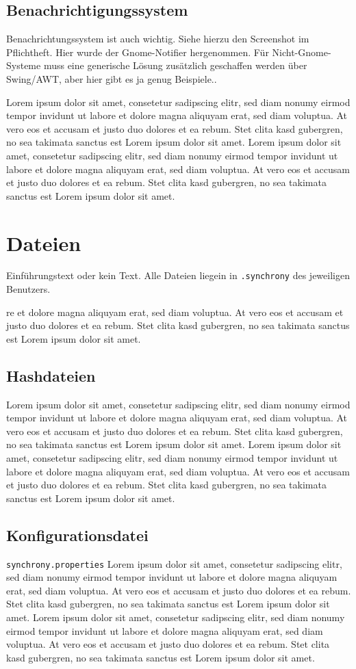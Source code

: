 \documentclass[12pt,oneside,a4paper,bibtotoc,liststotoc,pointlessnumbers]{scrartcl}
\begin{document}
\subsection{Benachrichtigungssystem}
Benachrichtungssystem ist auch wichtig. Siehe hierzu den Screenshot im Pflichtheft. Hier wurde der Gnome-Notifier hergenommen. Für Nicht-Gnome-Systeme muss eine generische Lösung zusätzlich geschaffen werden über Swing/AWT, aber hier gibt es ja genug Beispiele..

\vspace{12px}
Lorem ipsum dolor sit amet, consetetur sadipscing elitr, sed diam nonumy eirmod tempor invidunt ut labore et dolore magna aliquyam erat, sed diam voluptua. At vero eos et accusam et justo duo dolores et ea rebum. Stet clita kasd gubergren, no sea takimata sanctus est Lorem ipsum dolor sit amet. Lorem ipsum dolor sit amet, consetetur sadipscing elitr, sed diam nonumy eirmod tempor invidunt ut labore et dolore magna aliquyam erat, sed diam voluptua. At vero eos et accusam et justo duo dolores et ea rebum. Stet clita kasd gubergren, no sea takimata sanctus est Lorem ipsum dolor sit amet.

\newpage
\section{Dateien}
Einführungstext oder kein Text. Alle Dateien liegein in \texttt{.synchrony} des jeweiligen Benutzers.

\vspace{12px}
re et dolore magna aliquyam erat, sed diam voluptua. At vero eos et accusam et justo duo dolores et ea rebum. Stet clita kasd gubergren, no sea takimata sanctus est Lorem ipsum dolor sit amet.
\subsection{Hashdateien}
Lorem ipsum dolor sit amet, consetetur sadipscing elitr, sed diam nonumy eirmod tempor invidunt ut labore et dolore magna aliquyam erat, sed diam voluptua. At vero eos et accusam et justo duo dolores et ea rebum. Stet clita kasd gubergren, no sea takimata sanctus est Lorem ipsum dolor sit amet. Lorem ipsum dolor sit amet, consetetur sadipscing elitr, sed diam nonumy eirmod tempor invidunt ut labore et 
dolore magna aliquyam erat, sed diam voluptua. At vero eos et accusam et justo duo dolores et ea rebum. Stet clita kasd gubergren, no sea takimata sanctus est Lorem ipsum dolor sit amet.
\subsection{Konfigurationsdatei}
\texttt{synchrony.properties}
Lorem ipsum dolor sit amet, consetetur sadipscing elitr, sed diam nonumy eirmod tempor invidunt ut labore et dolore magna aliquyam erat, sed diam voluptua. At vero eos et accusam et justo duo dolores et ea rebum. Stet clita kasd gubergren, no sea takimata sanctus est Lorem ipsum dolor sit amet. Lorem ipsum dolor sit amet, consetetur sadipscing elitr, sed diam nonumy eirmod tempor invidunt ut labore et dolore magna aliquyam erat, sed diam voluptua. At vero eos et accusam et justo duo dolores et ea rebum. Stet clita kasd gubergren, no sea takimata sanctus est Lorem ipsum dolor sit amet.
\end{document}
